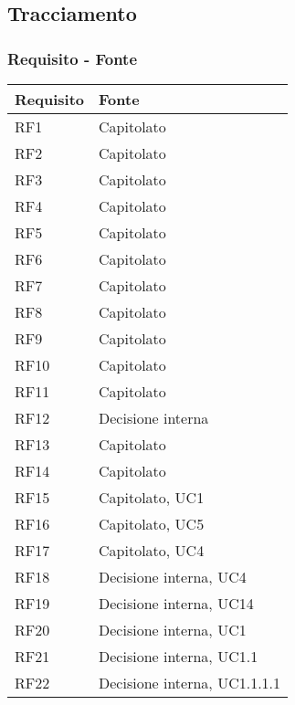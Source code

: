 \subsection{Tracciamento}

\subsubsection{Requisito - Fonte}

\begin{center}
    \begin{longtable}{|C{5cm}|C{5cm}|}
        \hline
        \textbf{Requisito} & \textbf{Fonte} \\
        \hline
        RF1 & Capitolato \\
        \hline
        RF2 & Capitolato \\
        \hline
        RF3 & Capitolato \\
        \hline
        RF4 & Capitolato \\
        \hline
        RF5 & Capitolato \\
        \hline
        RF6 & Capitolato \\
        \hline
        RF7 & Capitolato \\
        \hline
        RF8 & Capitolato \\
        \hline
        RF9 & Capitolato \\
        \hline
        RF10 & Capitolato \\
        \hline
        RF11 & Capitolato \\
        \hline
        RF12 & Decisione interna \\
        \hline
        RF13 & Capitolato \\
        \hline
        RF14 & Capitolato \\
        \hline
        RF15 & Capitolato, UC1 \\
        \hline
        RF16 & Capitolato, UC5 \\
        \hline
        RF17 & Capitolato, UC4 \\
        \hline
        RF18 & Decisione interna, UC4 \\
        \hline
        RF19 & Decisione interna, UC14 \\
        \hline
        RF20 & Decisione interna, UC1 \\
        \hline
        RF21 & Decisione interna, UC1.1 \\
        \hline
        RF22 & Decisione interna, UC1.1.1.1 \\

\end{longtable}
\end{center}
